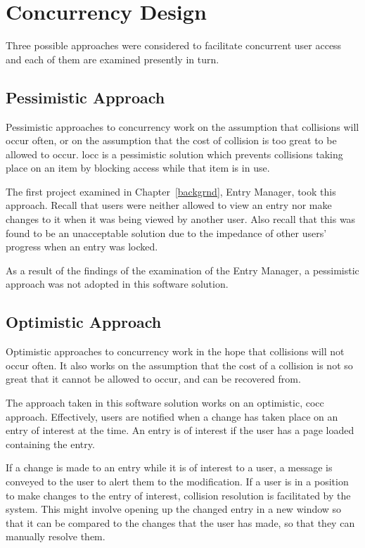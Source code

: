 \section{Concurrency Design}
\label{concurrency}
Three possible approaches were considered to facilitate concurrent user access and each of them are examined presently in turn.

\subsection{Pessimistic Approach}
Pessimistic approaches to concurrency work on the assumption that collisions will occur often, or on the assumption that the cost of collision is too great to be allowed to occur.  \gls{locc} is a pessimistic solution \cite{loccCocc} which prevents collisions taking place on an item by blocking access while that item is in use.

The first project examined in Chapter~\ref{backgrnd}, \bibtex{} Entry Manager, took this approach.  Recall that users were neither allowed to view an entry nor make changes to it when it was being viewed by another user.  Also recall that this was found to be an unacceptable solution due to the impedance of other users' progress when an entry was locked.

As a result of the findings of the examination of the \bibtex{} Entry Manager, a pessimistic approach was not adopted in this software solution.

\subsection{Optimistic Approach}
Optimistic approaches to concurrency work in the hope that collisions will not occur often.  It also works on the assumption that the cost of a collision is not so great that it cannot be allowed to occur, and can be recovered from.

The approach taken in this software solution works on an optimistic, \gls{cocc} approach.  Effectively, users are notified when a change has taken place on an entry of interest at the time.  An entry is of interest if the user has a page loaded containing the entry.

If a change is made to an entry while it is of interest to a user, a message is conveyed to the user to alert them to the modification.  If a user is in a position to make changes to the entry of interest, collision resolution is facilitated by the system.  This might involve opening up the changed entry in a new window so that it can be compared to the changes that the user has made, so that they can manually resolve them.

